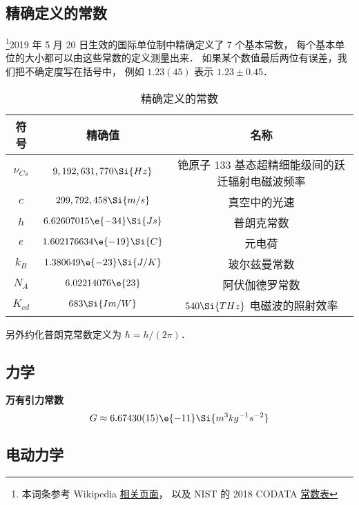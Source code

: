 

\subsection{精确定义的常数}
\footnote{本词条参考 Wikipedia \href{https://en.wikipedia.org/wiki/Physical_constant}{相关页面}， 以及 NIST 的 2018 CODATA \href{https://physics.nist.gov/cuu/Constants/Table/allascii.txt}{常数表}}2019 年 5 月 20 日生效的国际单位制中精确定义了 7 个基本常数， 每个基本单位的大小都可以由这些常数的定义测量出来． 如果某个数值最后两位有误差，我们把不确定度写在括号中， 例如 $1.23(45)$ 表示 $1.23 \pm 0.45$．
\begin{table}[ht]
\centering
\caption{精确定义的常数}\label{Consts_tab1}
\begin{tabular}{|c|c|c|}
\hline
符号 & 精确值 & 名称 \\
\hline
$\nu_{Cs}$ & $9,192,631,770\Si{Hz}$ & 铯原子 133 基态超精细能级间的跃迁辐射电磁波频率 \\
\hline
$c$ & $299,792,458\Si{m/s}$ & 真空中的光速 \\
\hline
$h$ & $6.62607015\e{-34}\Si{Js}$ & 普朗克常数 \\
\hline
$e$ & $1.602176634\e{-19}\Si{C} $ & 元电荷 \\
\hline
$k_B$ & $1.380649\e{-23} \Si{J/K}$ & 玻尔兹曼常数 \\
\hline
$N_A$ & $6.02214076\e{23} $ & 阿伏伽德罗常数 \\
\hline
$K_{cd}$ & $683\Si{Im/W}$ & $540\Si{THz}$ 电磁波的照射效率 \\
\hline
\end{tabular}
\end{table}
另外约化普朗克常数定义为 $\hbar = h/(2\pi)$．


\subsection{力学}
\textbf{万有引力常数}
\begin{equation}
G \approx 6.67430(15)\e{-11} \Si{m^3 kg^{-1} s^{-2}}
\end{equation}

\subsection{电动力学}

